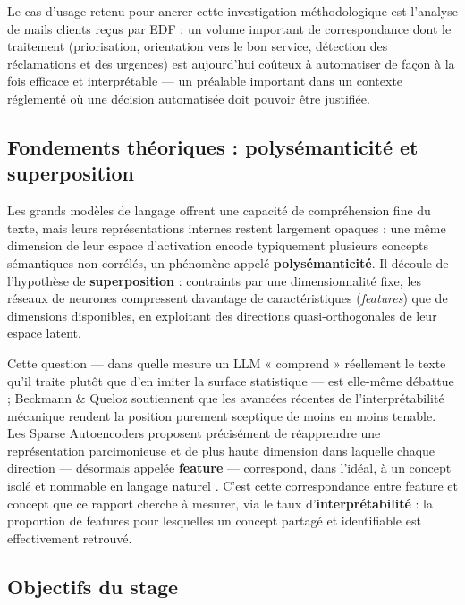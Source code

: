 \documentclass[11pt]{article}
\begin{document}
Le cas d'usage retenu pour ancrer cette investigation méthodologique est
l'analyse de mails clients reçus par EDF : un volume important de
correspondance dont le traitement (priorisation, orientation vers le bon
service, détection des réclamations et des urgences) est aujourd'hui coûteux à
automatiser de façon à la fois efficace et interprétable --- un préalable
important dans un contexte réglementé où une décision automatisée doit
pouvoir être justifiée.

\subsection{Fondements théoriques : polysémanticité et superposition}

Les grands modèles de langage offrent une capacité de compréhension fine du
texte, mais leurs représentations internes restent largement opaques : une
même dimension de leur espace d'activation encode typiquement plusieurs
concepts sémantiques non corrélés, un phénomène appelé
\textbf{polysémanticité}. Il découle de l'hypothèse de \textbf{superposition}
\cite{elhage2022superposition} : contraints par une dimensionnalité fixe, les
réseaux de neurones compressent davantage de caractéristiques (\emph{features})
que de dimensions disponibles, en exploitant des directions quasi-orthogonales
de leur espace latent.

Cette question --- dans quelle mesure un LLM « comprend » réellement le texte
qu'il traite plutôt que d'en imiter la surface statistique --- est elle-même
débattue ; Beckmann \& Queloz \cite{beckmannqueloz2026} soutiennent que les avancées récentes de
l'interprétabilité mécanique rendent la position purement sceptique de moins
en moins tenable. Les Sparse Autoencoders proposent précisément de réapprendre
une représentation parcimonieuse et de plus haute dimension dans laquelle
chaque direction --- désormais appelée \textbf{feature} --- correspond, dans
l'idéal, à un concept isolé et nommable en langage naturel
\cite{bricken2023monosemanticity, cunningham2023sparse}. C'est cette
correspondance entre feature et concept que ce rapport cherche à mesurer,
via le taux d'\textbf{interprétabilité} : la proportion de features pour
lesquelles un concept partagé et identifiable est effectivement retrouvé.

\subsection{Objectifs du stage}
\end{document}
